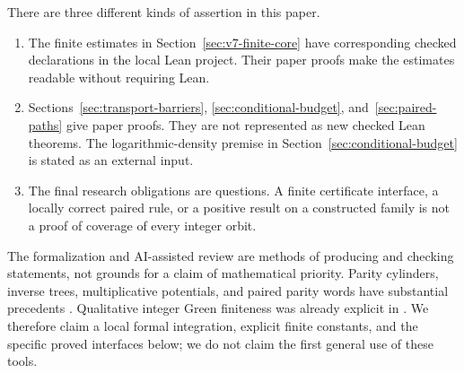 \documentclass[11pt,a4paper]{article}
\theoremstyle{definition}
\begin{document}
There are three different kinds of assertion in this paper.
\begin{enumerate}[leftmargin=*]
\item The finite estimates in Section~\ref{sec:v7-finite-core} have
corresponding checked declarations in the local Lean project. Their paper
proofs make the estimates readable without requiring Lean.
\item Sections~\ref{sec:transport-barriers}, \ref{sec:conditional-budget},
and~\ref{sec:paired-paths} give paper proofs. They are not represented as
new checked Lean theorems. The logarithmic-density premise in
Section~\ref{sec:conditional-budget} is stated as an external input.
\item The final research obligations are questions. A finite certificate
interface, a locally correct paired rule, or a positive result on a
constructed family is not a proof of coverage of every integer orbit.
\end{enumerate}

The formalization and AI-assisted review are methods of producing and
checking statements, not grounds for a claim of mathematical priority.
Parity cylinders, inverse trees, multiplicative potentials, and paired
parity words have substantial precedents
\cite{terras1976,lagarias2003,krasikovlagarias2003,garner1985,eliatucker2015}.
Qualitative integer Green finiteness was already explicit in
\cite[Proposition~11]{weaver9v1}. We therefore claim a local formal
integration, explicit finite constants, and the specific proved
interfaces below; we do not claim the first general use of these tools.
\end{document}
